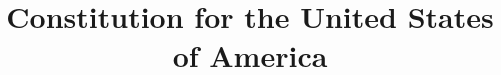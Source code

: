 \documentclass{constitution}
\title{Constitution for the United States of America}
\begin{document}
\maketitle
\tableofcontents*
\end{document}
